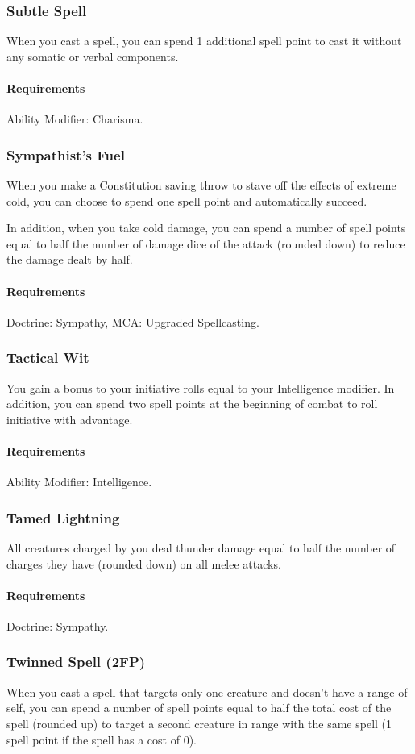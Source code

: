 \subsubsection{Subtle Spell} \label{feat::subtlespell}
    When you cast a spell, you can spend 1 additional spell point to cast it without any somatic or verbal components.
    \paragraph{Requirements} Ability Modifier: Charisma.
\subsubsection{Sympathist's Fuel} \label{feat::sympathistsfuel}
    When you make a Constitution saving throw to stave off the effects of extreme cold, you can choose to spend one spell point and automatically succeed.

    In addition, when you take cold damage, you can spend a number of spell points equal to half the number of damage dice of the attack (rounded down) to reduce the damage dealt by half.
    \paragraph{Requirements} Doctrine: Sympathy, MCA: Upgraded Spellcasting.
\subsubsection{Tactical Wit} \label{feat::tacticalwit}
    You gain a bonus to your initiative rolls equal to your Intelligence modifier.
    In addition, you can spend two spell points at the beginning of combat to roll initiative with advantage.
    \paragraph{Requirements} Ability Modifier: Intelligence.
\subsubsection{Tamed Lightning} \label{feat::tamedlightning}
    All creatures charged by you deal thunder damage equal to half the number of charges they have (rounded down) on all melee attacks.
    \paragraph{Requirements} Doctrine: Sympathy.
\subsubsection{Twinned Spell (2FP)} \label{feat::twinnedspell}
    When you cast a spell that targets only one creature and doesn't have a range of self, you can spend a number of spell points equal to half the total cost of the spell (rounded up) to target a second creature in range with the same spell (1 spell point if the spell has a cost of 0).

